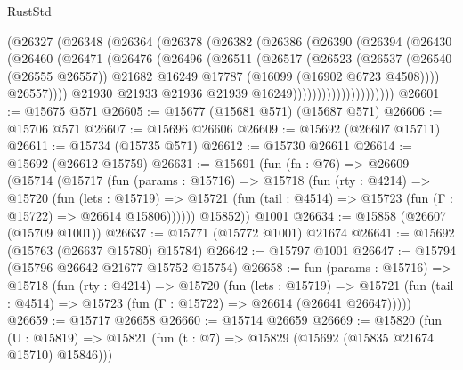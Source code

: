 \begin{lexlean}{RustStd}
\begin{coremodule}
                        (@26327
                          (@26348
                            (@26364
                              (@26378
                                (@26382
                                  (@26386
                                    (@26390
                                      (@26394
                                        (@26430
                                          (@26460
                                            (@26471
                                              (@26476
                                                (@26496
                                                  (@26511
                                                    (@26517
                                                      (@26523
                                                        (@26537
                                                          (@26540 (@26555 @26557))
                                                          @21682
                                                          @16249
                                                          @17787
                                                          (@16099 (@16902 @6723 @4508))))
                                                      @26557))))
                                              @21930
                                              @21933
                                              @21936
                                              @21939
                                              @16249)))))))))))))))))))))
@26601 := @15675 @571
@26605 := @15677 (@15681 @571) (@15687 @571)
@26606 := @15706 @571
@26607 := @15696 @26606
@26609 := @15692 (@26607 @15711)
@26611 := @15734 (@15735 @571)
@26612 := @15730 @26611
@26614 := @15692 (@26612 @15759)
@26631 := @15691
    (fun (fn : @76) =>
    @26609
      (@15714
        (@15717
          (fun (params : @15716) =>
          @15718
            (fun (rty : @4214) =>
            @15720
              (fun (lets : @15719) =>
              @15721 (fun (tail : @4514) => @15723 (fun (Γ : @15722) => @26614 @15806))))))
        @15852))
    @1001
@26634 := @15858 (@26607 (@15709 @1001))
@26637 := @15771 (@15772 @1001) @21674
@26641 := @15692 (@15763 (@26637 @15780) @15784)
@26642 := @15797 @1001
@26647 := @15794 (@15796 @26642 @21677 @15752 @15754)
@26658 := fun (params : @15716) =>
  @15718
    (fun (rty : @4214) =>
    @15720
      (fun (lets : @15719) =>
      @15721 (fun (tail : @4514) => @15723 (fun (Γ : @15722) => @26614 (@26641 @26647)))))
@26659 := @15717 @26658
@26660 := @15714 @26659
@26669 := @15820
    (fun (U : @15819) => @15821 (fun (t : @7) => @15829 (@15692 (@15835 @21674 @15710) @15846)))

\end{coremodule}
\end{lexlean}
